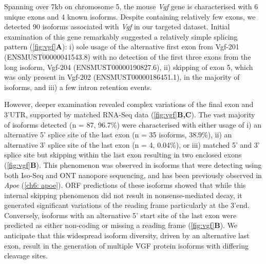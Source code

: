 Spanning over 7kb on chromosome 5, the mouse \textit{Vgf} gene is characterised with 6 unique exons and 4 known isoforms. Despite containing relatively few exons, we detected 90 isoforms associated with \textit{Vgf} in our targeted dataset. Initial examination of this gene  remarkably suggested a relatively simple splicing pattern (\cref{fig:vgf}\textbf{A}): i) sole usage of the alternative first exon from Vgf-201 (ENSMUST00000041543.8) with no detection of the first three exons from the long isoform, Vgf-204 (ENSMUST00000190827.6), ii) skipping of exon 5, which was only present in Vgf-202 (ENSMUST00000186451.1), in the majority of isoforms, and iii) a few intron retention events. 

However, deeper examination revealed complex variations of the final exon and 3'UTR, supported by matched RNA-Seq data (\cref{fig:vgf}\textbf{B,C}). The vast majority of isoforms detected (n = 87, 96.7\%) were characterised with either usage of i) an alternative 5' splice site of the last exon (n = 35 isoforms, 38.9\%), ii) an alternative 3' splice site of the last exon (n = 4, 0.04\%), or iii) matched 5' and 3' splice site but skipping within the last exon resulting in two enclosed exons (\cref{fig:vgf}\textbf{B}). This phenomenon was observed in isoforms that were detecting using both Iso-Seq and ONT nanopore sequencing, and has been previously observed in \textit{Apoe} (\cref{ch6: apoe}). ORF predictions of these isoforms showed that while this internal skipping phenomenon did not result in nonsense-mediated decay, it generated significant variations of the reading frame particularly at the 3'end. Conversely, isoforms with an alternative 5' start site of the last exon were predicted as either non-coding or missing a reading frame (\cref{fig:vgf}\textbf{B}). We anticipate that this widespread isoform diversity, driven by an alternative last exon, result in the generation of multiple VGF protein isoforms with differing cleavage sites. 

